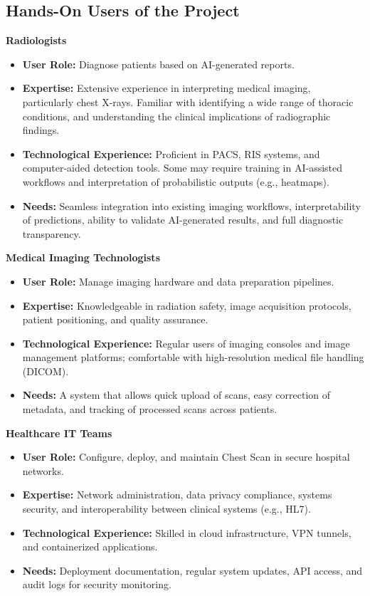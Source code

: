 \documentclass[12pt]{article}
\begin{document}
\subsection{Hands-On Users of the Project}

\textbf{Radiologists}
\begin{itemize}
    \item \textbf{User Role:} Diagnose patients based on AI-generated reports.
    \item \textbf{Expertise:} Extensive experience in interpreting medical imaging, particularly chest X-rays. Familiar with identifying a wide range of thoracic conditions, and understanding the clinical implications of radiographic findings.
    \item \textbf{Technological Experience:} Proficient in PACS, RIS systems, and computer-aided detection tools. Some may require training in AI-assisted workflows and interpretation of probabilistic outputs (e.g., heatmaps).
    \item \textbf{Needs:} Seamless integration into existing imaging workflows, interpretability of predictions, ability to validate AI-generated results, and full diagnostic transparency.
\end{itemize}

\textbf{Medical Imaging Technologists}
\begin{itemize}
    \item \textbf{User Role:} Manage imaging hardware and data preparation pipelines.
    \item \textbf{Expertise:} Knowledgeable in radiation safety, image acquisition protocols, patient positioning, and quality assurance.
    \item \textbf{Technological Experience:} Regular users of imaging consoles and image management platforms; comfortable with high-resolution medical file handling (DICOM)\cite{dicom}.
    \item \textbf{Needs:} A system that allows quick upload of scans, easy correction of metadata, and tracking of processed scans across patients.
\end{itemize}

\textbf{Healthcare IT Teams}
\begin{itemize}
    \item \textbf{User Role:} Configure, deploy, and maintain Chest Scan in secure hospital networks.
    \item \textbf{Expertise:} Network administration, data privacy compliance, systems security, and interoperability between clinical systems (e.g., HL7).
    \item \textbf{Technological Experience:} Skilled in cloud infrastructure, VPN tunnels, and containerized applications.
    \item \textbf{Needs:} Deployment documentation, regular system updates, API access, and audit logs for security monitoring.
\end{itemize}
\end{document}
